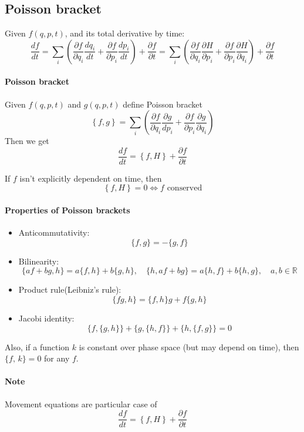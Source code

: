 \subsection{Poisson bracket}
Given $f(q,p,t)$, and its total derivative by time:
$$\frac{df}{dt} = \sum_i \left( \frac{\partial f}{\partial q_i} \frac{dq_i}{dt} + \frac{\partial f}{\partial p_i} \frac{dp_i}{dt}  \right) + \frac{\partial f}{\partial t} = \sum_i \left( \frac{\partial f}{\partial q_i} \frac{\partial H}{\partial p_i} + \frac{\partial f}{\partial p_i} \frac{\partial H}{\partial q_i}  \right) + \frac{\partial f}{\partial t}$$

\paragraph{Poisson bracket}
Given $f(q,p,t)$ and $g(q,p,t)$ define  Poisson bracket
$$\left\{ f,g \right\} = \sum_i \left( \frac{\partial f}{\partial q_i} \frac{\partial g}{dp_i} + \frac{\partial f}{\partial p_i} \frac{\partial g}{\partial q_i}  \right)$$
Then we get
$$\frac{df}{dt} = \left\{ f, H \right\} + \frac{\partial f}{\partial t}$$

If $f$ isn't explicitly dependent on time, then
$$\left\{ f,H \right\} =0 \iff f \text{ conserved}$$

\paragraph{Properties of Poisson brackets}
\begin{itemize}
	\item Anticommutativity: $$\{f, g\} = -\{g, f\}$$
	\item  Bilinearity: $$\{af + bg, h\} = a\{f, h\} + b\{g, h\}, \quad \{h, af + bg\} = a\{h, f\} + b\{h, g\}, \quad a, b \in \mathbb R$$
	\item  Product rule(Leibniz's rule): $$\{fg, h\} = \{f, h\}g + f\{g, h\}$$
	\item  Jacobi identity: $$\{f, \{g, h\}\} + \{g, \{h, f\}\} +  \{h, \{f, g\}\} = 0$$
\end{itemize}

Also, if a function $k$ is constant over phase space (but may depend on time), then $\{f,\, k\} = 0$ for any $f$.

\paragraph{Note}
Movement equations are particular case of 
$$\frac{df}{dt} = \left\{ f,H \right\} + \frac{\partial f}{\partial t} $$

